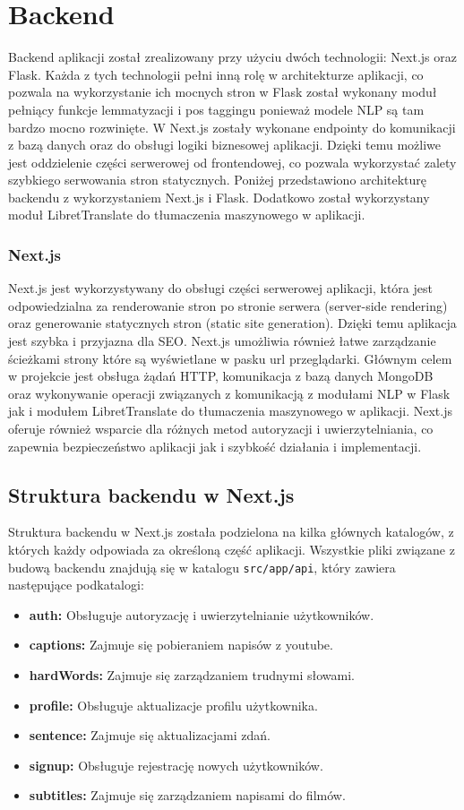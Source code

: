 
\section{Backend}
Backend aplikacji został zrealizowany przy użyciu dwóch technologii: Next.js oraz Flask. Każda z tych technologii pełni inną rolę w architekturze aplikacji, co pozwala na wykorzystanie ich mocnych stron w Flask został wykonany moduł pełniący funkcje lemmatyzacji i pos taggingu ponieważ modele NLP są tam bardzo mocno rozwinięte. W Next.js zostały wykonane endpointy do komunikacji z bazą danych oraz do obsługi logiki biznesowej aplikacji. Dzięki temu możliwe jest oddzielenie części serwerowej od frontendowej, co pozwala wykorzystać zalety szybkiego serwowania stron statycznych. Poniżej przedstawiono architekturę backendu z wykorzystaniem Next.js i Flask. Dodatkowo został wykorzystany moduł LibretTranslate do tłumaczenia maszynowego w aplikacji.

\subsubsection{Next.js}
Next.js jest wykorzystywany do obsługi części serwerowej aplikacji, która jest odpowiedzialna za renderowanie stron po stronie serwera (server-side rendering) oraz generowanie statycznych stron (static site generation). Dzięki temu aplikacja jest szybka i przyjazna dla SEO. Next.js umożliwia również łatwe zarządzanie ścieżkami strony które są wyświetlane w pasku url przeglądarki. Głównym celem w projekcie jest obsługa żądań HTTP, komunikacja z bazą danych MongoDB oraz wykonywanie operacji związanych z komunikacją z modułami NLP w Flask jak i modułem LibretTranslate do tłumaczenia maszynowego w aplikacji. Next.js oferuje również wsparcie dla różnych metod autoryzacji i uwierzytelniania, co zapewnia bezpieczeństwo aplikacji jak i szybkość działania i implementacji.
\subsection{Struktura backendu w Next.js}
Struktura backendu w Next.js została podzielona na kilka głównych katalogów, z których każdy odpowiada za określoną część aplikacji. Wszystkie pliki związane z budową backendu znajdują się w katalogu \texttt{src/app/api}, który zawiera następujące podkatalogi:

\begin{itemize}
    \item \textbf{auth:} Obsługuje autoryzację i uwierzytelnianie użytkowników.
    \item \textbf{captions:} Zajmuje się pobieraniem napisów z youtube.
    \item \textbf{hardWords:} Zajmuje się zarządzaniem trudnymi słowami.
    \item \textbf{profile:} Obsługuje aktualizacje profilu użytkownika.
    \item \textbf{sentence:} Zajmuje się aktualizacjami zdań.
    \item \textbf{signup:} Obsługuje rejestrację nowych użytkowników.
    \item \textbf{subtitles:} Zajmuje się zarządzaniem napisami do filmów.
\end{itemize}

